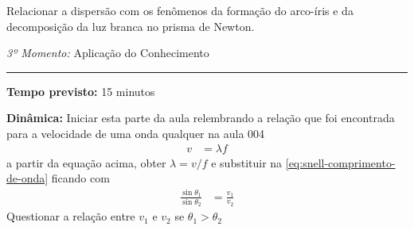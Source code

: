   Relacionar a dispersão com os fenômenos da formação do arco-íris e da decomposição da luz branca no prisma de Newton.

    

    \newpage
    \bigskip
    \noindent\emph{3º Momento:} Aplicação do Conhecimento
    \par\noindent\rule{.3\textwidth}{.5pt}  
    \par\noindent\textbf{Tempo previsto:} 15 minutos
    \smallskip
    \par\noindent\textbf{Dinâmica:} Iniciar esta parte da aula relembrando a relação que foi encontrada para a velocidade de uma onda qualquer na aula 004
    \begin{align}
        v&=\lambda f
    \end{align}
    a partir da equação acima, obter $\lambda=v/f$ e substituir na \eqref{eq:snell-comprimento-de-onda} ficando com
    \begin{align}
    \label{eq:lei-de-snell-velocidades}
        \frac{\sin\theta_1}{\sin\theta_2}&=\frac{v_1}{v_2}
    \end{align}
    Questionar a relação entre $v_1$ e $v_2$ se $\theta_1>\theta_2$

